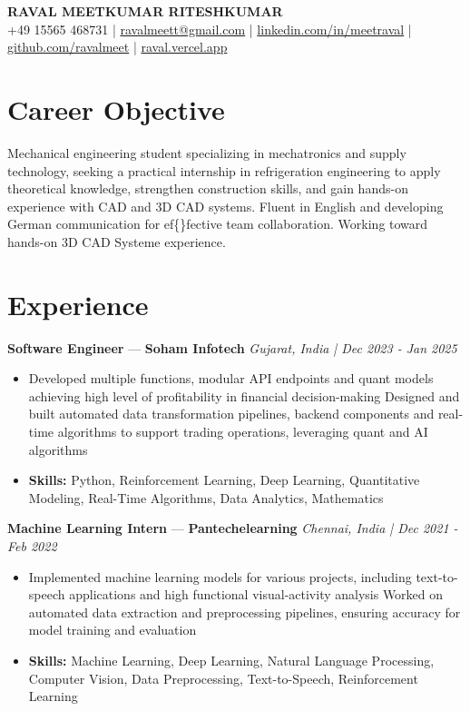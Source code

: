 \documentclass[a4paper,10pt]{article}
\begin{document}
\begin{center}
  {\Large\bfseries RAVAL MEETKUMAR RITESHKUMAR}\\[2pt]
  {\small +49 15565 468731 \;|\; \href{mailto:ravalmeett@gmail.com}{ravalmeett@gmail.com} \;|\; \href{https://www.linkedin.com/in/meetraval/}{linkedin.com/in/meetraval} \;|\; \href{https://github.com/ravalmeet}{github.com/ravalmeet} \;|\; \href{https://raval.vercel.app/}{raval.vercel.app}}
\end{center}
\vspace{-3pt}

\section*{Career Objective}
Mechanical engineering student specializing in mechatronics and supply technology, seeking a practical internship in refrigeration engineering to apply theoretical knowledge, strengthen construction skills, and gain hands-on experience with CAD and 3D CAD systems. Fluent in English and developing German communication for ef\{\}fective team collaboration. Working toward hands-on 3D CAD Systeme experience.\par

\section*{Experience}
\textbf{Software Engineer} — \textbf{Soham Infotech} \hfill \textit{Gujarat, India \;|\; Dec 2023 - Jan 2025}\par
\vspace{1pt}
\begin{itemize}
  \item Developed multiple functions, modular API endpoints and quant models achieving high level of profitability in financial decision-making Designed and built automated data transformation pipelines, backend components and real-time algorithms to support trading operations, leveraging quant and AI algorithms
  \item \textbf{Skills:} Python, Reinforcement Learning, Deep Learning, Quantitative Modeling, Real-Time Algorithms, Data Analytics, Mathematics
\end{itemize}
\vspace{3pt}
\textbf{Machine Learning Intern} — \textbf{Pantechelearning} \hfill \textit{Chennai, India \;|\; Dec 2021 - Feb 2022}\par
\vspace{1pt}
\begin{itemize}
  \item Implemented machine learning models for various projects, including text-to-speech applications and high functional visual-activity analysis Worked on automated data extraction and preprocessing pipelines, ensuring accuracy for model training and evaluation
  \item \textbf{Skills:} Machine Learning, Deep Learning, Natural Language Processing, Computer Vision, Data Preprocessing, Text-to-Speech, Reinforcement Learning
\end{itemize}
\end{document}
